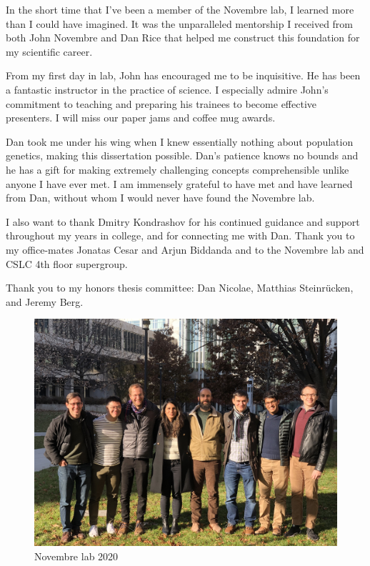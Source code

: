 \acknowledgments

In the short time that I've been a member of the Novembre lab, I learned more than I could have imagined. It was the unparalleled mentorship I received from both John Novembre and Dan Rice that helped me construct this foundation for my scientific career.

From my first day in lab, John has encouraged me to be inquisitive. He has been a fantastic instructor in the practice of science. I especially admire John's commitment to teaching and preparing his trainees to become effective presenters. I will miss our paper jams and coffee mug awards. 

Dan took me under his wing when I knew essentially nothing about population genetics, making this dissertation possible. Dan's patience knows no bounds and he has a gift for making extremely challenging concepts comprehensible unlike anyone I have ever met. I am immensely grateful to have met and have learned from Dan, without whom I would never have found the Novembre lab. 

I also want to thank Dmitry Kondrashov for his continued guidance and support throughout my years in college, and for connecting me with Dan. Thank you to my office-mates Jonatas Cesar and Arjun Biddanda and to the Novembre lab and CSLC 4th floor supergroup. 

Thank you to my honors thesis committee: Dan Nicolae, Matthias Steinrücken, and Jeremy Berg. 
 
\begin{figure}[h]
    \centering
    \includegraphics[scale=0.075]{img/IMG_1361.jpg}
    \caption{Novembre lab 2020}
    \label{fig:lab_photo}
\end{figure}
